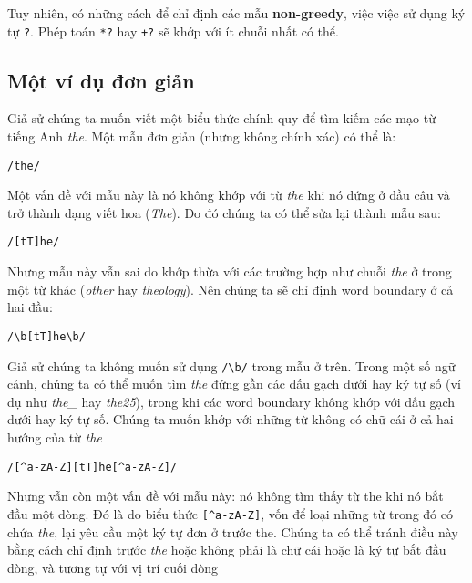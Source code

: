 Tuy nhiên, có những cách để chỉ định các mẫu \textbf{non-greedy}, việc việc sử dụng ký tự \verb|?|. Phép toán \verb|*?| hay \verb|+?| sẽ khớp với ít chuỗi nhất có thể.

\subsection{Một ví dụ đơn giản}

Giả sử chúng ta muốn viết một biểu thức chính quy để tìm kiếm các mạo từ tiếng Anh \textit{the}. Một mẫu đơn giản (nhưng không chính xác) có thể là:

\vspace{0.6em}

\noindent \verb|/the/|

\vspace{0.6em}

Một vấn đề với mẫu này là nó không khớp với từ \textit{the} khi nó đứng ở đầu câu và trở thành dạng viết hoa (\textit{The}). Do đó chúng ta có thể sửa lại thành mẫu sau:

\vspace{0.6em}

\noindent \verb|/[tT]he/|

\vspace{0.6em}

Nhưng mẫu này vẫn sai do khớp thừa với các trường hợp như chuỗi \textit{the} ở trong một từ khác (\textit{other} hay \textit{theology}). Nên chúng ta sẽ chỉ định word boundary ở cả hai đầu:

\vspace{0.6em}

\noindent \verb|/\b[tT]he\b/|

\vspace{0.6em}

Giả sử chúng ta không muốn sử dụng \verb|/\b/| trong mẫu ở trên. Trong một số ngữ cảnh, chúng ta có thể muốn tìm \textit{the} đứng gần các dấu gạch dưới hay ký tự số (ví dụ như \textit{the\_} hay \textit{the25}), trong khi các word boundary không khớp với dấu gạch dưới hay ký tự số. Chúng ta muốn khớp với những từ không có chữ cái ở cả hai hướng của từ \textit{the}

\vspace{0.6em}

\noindent \verb|/[^a-zA-Z][tT]he[^a-zA-Z]/|

\vspace{0.6em}

Nhưng vẫn còn một vấn đề với mẫu này: nó không tìm thấy từ the khi nó bắt đầu một dòng. Đó là do biểu thức \verb|[^a-zA-Z]|, vốn để loại những từ trong đó có chứa \textit{the}, lại yêu cầu một ký tự đơn ở trước the. Chúng ta có thể tránh điều này bằng cách chỉ định trước \textit{the} hoặc không phải là chữ cái hoặc là ký tự bắt đầu dòng, và tương tự với vị trí cuối dòng

